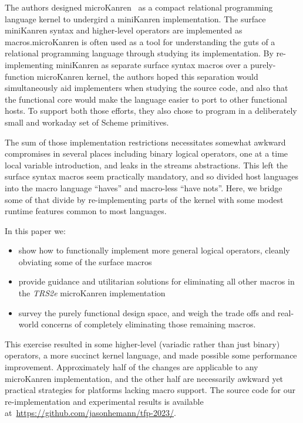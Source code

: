 \documentclass[sigplan,draft,balance,pbalance,natbib=false]{acmart}
\begin{document}
The authors designed microKanren~\cite{hemann2013muKanren} as a
compact relational programming language kernel to undergird a
miniKanren implementation. The surface miniKanren syntax and
higher-level operators are implemented as macros.\@ microKanren is
often used as a tool for understanding the guts of a relational
programming language through studying its implementation. By
re-implementing miniKanren as separate surface syntax macros over a
purely-function microKanren kernel, the authors hoped this separation
would simultaneously aid implementers when studying the source code,
and also that the functional core would make the language easier to
port to other functional hosts. To support both those efforts, they
also chose to program in a deliberately small and workaday set of
Scheme primitives.

The sum of those implementation restrictions necessitates somewhat
awkward compromises in several places including binary logical
operators, one at a time local variable introduction, and leaks in the
streams abstractions. This left the surface syntax macros seem
practically mandatory, and so divided host languages into the macro
language \enquote{haves} and macro-less \enquote{have nots}. Here, we
bridge some of that divide by re-implementing parts of the kernel with
some modest runtime features common to most languages.

In this paper we:
%
\begin{itemize}

\item show how to functionally implement more general logical
  operators, cleanly obviating some of the surface macros

\item provide guidance and utilitarian solutions for eliminating all
  other macros in the \emph{TRS2e} microKanren implementation

\item survey the purely functional design space, and weigh the trade
  offs and real-world concerns of completely eliminating those
  remaining macros.

\end{itemize}

This exercise resulted in some higher-level (variadic rather than just
binary) operators, a more succinct kernel language, and made possible
some performance improvement. Approximately half of the changes are
applicable to any microKanren implementation, and the other half are
necessarily awkward yet practical strategies for platforms lacking
macro support. The source code for our re-implementation and
experimental results is available
at~\url{https://github.com/jasonhemann/tfp-2023/}.
\end{document}
